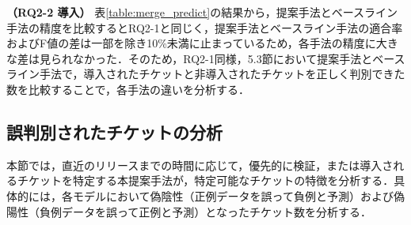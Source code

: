 \documentclass[T,J]{fose} %
\begin{document}
\textbf{（RQ2-2 導入）} 表\ref{table:merge_predict}の結果から，提案手法とベースライン手法の精度を比較するとRQ2-1と同じく，提案手法とベースライン手法の適合率およびF値の差は一部を除き10\%未満に止まっているため，各手法の精度に大きな差は見られなかった．そのため，RQ2-1同様，5.3節において提案手法とベースライン手法で，導入されたチケットと非導入されたチケットを正しく判別できた数を比較することで，各手法の違いを分析する．


\subsection{誤判別されたチケットの分析}
本節では，直近のリリースまでの時間に応じて，優先的に検証，または導入されるチケットを特定する本提案手法が，特定可能なチケットの特徴を分析する．具体的には，各モデルにおいて偽陰性（正例データを誤って負例と予測）および偽陽性（負例データを誤って正例と予測）となったチケット数を分析する．
\end{document}
